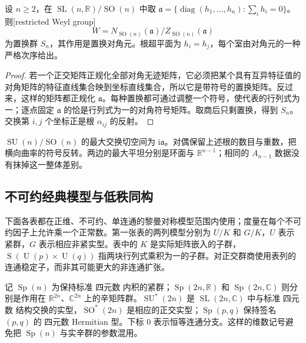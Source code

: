 \begin{proposition}\label{g3:prop:sl-restricted-weyl-group}
	设 \(n\ge2\)，在 \(\operatorname{SL}(n,\mathbb R)/\operatorname{SO}(n)\) 中取 \(\mathfrak a=\{\operatorname{diag}(h_1,\ldots,h_n):\sum_i h_i=0\}\)。则[restricted Weyl group]
	\[
		W=N_{\operatorname{SO}(n)}(\mathfrak a)/Z_{\operatorname{SO}(n)}(\mathfrak a)
	\]
	为置换群 \(S_n\)，其作用是置换对角元。根超平面为 \(h_i=h_j\)，每个室由对角元的一种严格次序给出。
\end{proposition}
\begin{proof}
	若一个正交矩阵正规化全部对角无迹矩阵，它必须把某个具有互异特征值的对角矩阵的特征直线集合映到坐标直线集合，所以它是带符号的置换矩阵。反过来，这样的矩阵都正规化 \(\mathfrak a\)。每种置换都可通过调整一个符号，使代表的行列式为一；逐点固定 \(\mathfrak a\) 的恰是行列式为一的对角符号矩阵。取商后只剩置换，得到 \(S_n\)。交换第 \(i,j\) 个坐标正是根 \(\alpha_{ij}\) 的反射。
\end{proof}

\(\operatorname{SU}(n)/\operatorname{SO}(n)\) 的最大交换切空间为 \(\mathrm i\mathfrak a\)。对偶保留上述根的数目与重数，把横向曲率的符号反转。两边的最大平坦分别是环面与 \(\mathbb R^{n-1}\)；相同的 \(A_{n-1}\) 数据没有抹掉这一整体差别。

\subsection{不可约经典模型与低秩同构}
\label{g3:subsec:0506:03}

下面各表都在正维、不可约、单连通的黎曼对称模型范围内使用；度量在每个不可约因子上允许乘一个正常数。第一张表的两列模型分别为 \(U/K\) 和 \(G/K\)，\(U\) 表示紧群，\(G\) 表示相应非紧实型。表中的 \(K\) 是实际矩阵嵌入的子群，\(\operatorname S(\operatorname U(p)\times\operatorname U(q))\) 指两块行列式乘积为一的子群。对正交群商使用表列的连通稳定子，而非其可能更大的非连通扩张。

\ProseParagraphBreak

记 \(\operatorname{Sp}(n)\) 为保持标准 四元数 内积的紧群；\(\operatorname{Sp}(2n,\mathbb R)\) 和 \(\operatorname{Sp}(2n,\mathbb C)\) 则分别是作用在 \(\mathbb R^{2n}\)、\(\mathbb C^{2n}\) 上的辛矩阵群。\(\operatorname{SU}^*(2n)\) 是 \(\operatorname{SL}(2n,\mathbb C)\) 中与标准 四元数 结构交换的实型，\(\operatorname{SO}^*(2n)\) 是相应的正交实型；\(\operatorname{Sp}(p,q)\) 保持签名 \((p,q)\) 的 四元数 Hermitian 型。下标 \(0\) 表示恒等连通分支。这样的维数记号避免把 \(\operatorname{Sp}(n)\) 与实辛群的参数混用。

